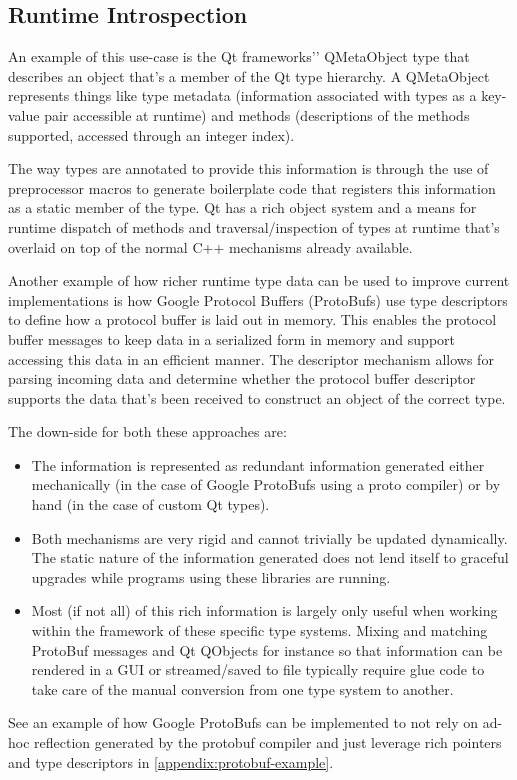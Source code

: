 \subsection{Runtime Introspection}

An example of this use-case is the Qt frameworks'’ QMetaObject type that
describes an object that’s a member of the Qt type hierarchy. A QMetaObject
represents things like type metadata (information associated with types as a
key-value pair accessible at runtime) and methods (descriptions of the methods
supported, accessed through an integer index).

The way types are annotated to provide this information is through the use of
preprocessor macros to generate boilerplate code that registers this information
as a static member of the type. Qt has a rich object system and a means for
runtime dispatch of methods and traversal/inspection of types at runtime that’s
overlaid on top of the normal C++ mechanisms already available. 

Another example of how richer runtime type data can be used to improve current
implementations is how Google Protocol Buffers (ProtoBufs) use type descriptors
to define how a protocol buffer is laid out in memory. This enables the protocol
buffer messages to keep data in a serialized form in memory and support
accessing this data in an efficient manner. The descriptor mechanism allows for
parsing incoming data and determine whether the protocol buffer descriptor
supports the data that’s been received to construct an object of the correct
type.

The down-side for both these approaches are:

\begin{itemize}
\item The information is represented as redundant information generated either
mechanically (in the case of Google ProtoBufs using a proto compiler) or by hand
(in the case of custom Qt types).

\item Both mechanisms are very rigid and cannot trivially be updated
dynamically. The static nature of the information generated does not lend itself
to graceful upgrades while programs using these libraries are running.

\item Most (if not all) of this rich information is largely only useful when
working within the framework of these specific type systems. Mixing and matching
ProtoBuf messages and Qt QObjects for instance so that information can be
rendered in a GUI or streamed/saved to file typically require glue code to take
care of the manual conversion from one type system to another.
\end{itemize}

See an example of how Google ProtoBufs can be implemented to not rely on ad-hoc
reflection generated by the protobuf compiler and just leverage rich pointers
and type descriptors in \autoref{appendix:protobuf-example}.
